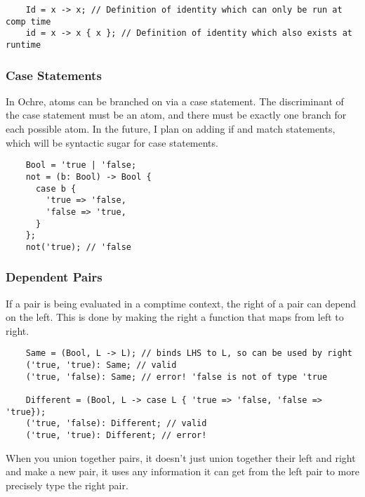 \documentclass[12pt,twoside]{report}
\begin{document}
  \begin{verbatim}
    Id = x -> x; // Definition of identity which can only be run at comp time
    id = x -> x { x }; // Definition of identity which also exists at runtime
  \end{verbatim}

\subsubsection{Case Statements}
In Ochre, atoms can be branched on via a case statement. The discriminant of the case statement must be an atom, and there must be exactly one branch for each possible atom. In the future, I plan on adding if and match statements, which will be syntactic sugar for case statements.

  \begin{verbatim}
    Bool = 'true | 'false;
    not = (b: Bool) -> Bool {
      case b {
        'true => 'false,
        'false => 'true,
      }
    };
    not('true); // 'false
  \end{verbatim}

\subsubsection{Dependent Pairs}
If a pair is being evaluated in a comptime context, the right of a pair can depend on the left. This is done by making the right a function that maps from left to right.

  \begin{verbatim}
    Same = (Bool, L -> L); // binds LHS to L, so can be used by right
    ('true, 'true): Same; // valid
    ('true, 'false): Same; // error! 'false is not of type 'true

    Different = (Bool, L -> case L { 'true => 'false, 'false => 'true});
    ('true, 'false): Different; // valid
    ('true, 'true): Different; // error!
  \end{verbatim}

When you union together pairs, it doesn't just union together their left and right and make a new pair, it uses any information it can get from the left pair to more precisely type the right pair.
\end{document}
